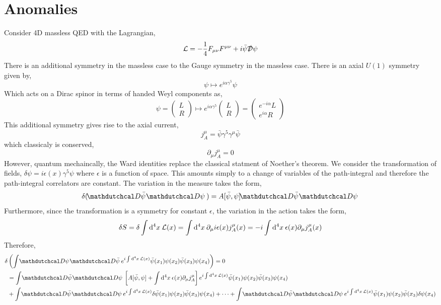 \documentclass[12pt]{extarticle}
\begin{document}
\section{Anomalies}

Consider 4D massless QED with the Lagrangian,
\[ \mathcal{L} = - \frac{1}{4} F_{\mu \nu} F^{\mu \nu} + i \bar{\psi} \slashed{\mathcal{D}} \psi \]
There is an additional symmetry in the massless case to the Gauge symmetry in the massless case. There is an axial $U(1)$ symmetry given by,
\[ \psi \mapsto e^{i \alpha \gamma^5} \psi \]
Which acts on a Dirac spinor in terms of handed Weyl components as,
\[ \psi = 
\begin{pmatrix}
L 
\\
R
\end{pmatrix}
\mapsto e^{i \alpha \gamma^5}
\begin{pmatrix}
L 
\\
R
\end{pmatrix}
= 
\begin{pmatrix}
e^{- i \alpha} L 
\\
e^{i \alpha} R
\end{pmatrix} \]
This additional symmetry gives rise to the axial current,
\[ j_A^\mu = \bar{\psi} \gamma^5 \gamma^\mu \bar{\psi} \]
which classicaly is conserved,
\[ \partial_\mu j_A^\mu = 0 \]
However, quantum mechaincally, the Ward identities replace the classical statment of Noether's theorem. We consider the transformation of fields, $\delta \psi = i \epsilon(x) \gamma^5 \psi$ where $\epsilon$ is a function of space. This amounts simply to a change of variables of the path-integral and therefore the path-integral correlators are constant. The variation in the measure takes the form,
\[ \delta (\pathd{\bar{\psi}} \pathd{\psi}) = A[\bar{\psi}, \psi]  \pathd{\bar{\psi}} \pathd{\psi} \]
Furthermore, since the transformation is a symmetry for constant $\epsilon$, the variation in the action takes the form,
\[ \delta S = \delta \int \mathrm{d}^{4} x \: \mathcal{L}(x) = \int \mathrm{d}^{4} x \: \partial_\mu i \epsilon(x) j_A^\mu(x) = - i \int \mathrm{d}^{4} x \: \epsilon(x) \partial_\mu j_A^{\mu}(x) \]
Therefore,
\begin{align*}
\delta & \left( \int \pathd{\psi} \pathd{\bar{\psi}} e^{i \int \dn{4}{x} \lagrange(x)} \bar{\psi}(x_1) \psi(x_2) \bar{\psi}(x_3) \psi(x_4) \right) = 0
\\
& = \int \pathd{\bar{\psi}} \pathd{\psi} \left[ A[\bar{\psi}, \psi]  + \int \dn{4}{x} \epsilon(x) \partial_\mu j_A^\mu \right] e^{i \int \dn{4}{x} \lagrange(x)} \bar{\psi}(x_1) \psi(x_2) \bar{\psi}(x_3) \psi(x_4)
\\
& + \int \pathd{\bar{\psi}} \pathd{\psi} e^{i \int \dn{4}{x} \lagrange(x)} \delta \bar{\psi}(x_1) \psi(x_2) \bar{\psi}(x_3) \psi(x_4) + \cdots + \int \pathd{\bar{\psi}} \pathd{\psi} e^{i \int \dn{4}{x} \lagrange(x)} \bar{\psi}(x_1) \psi(x_2) \bar{\psi}(x_3) \delta \psi(x_4)
\end{align*}  
\end{document}
